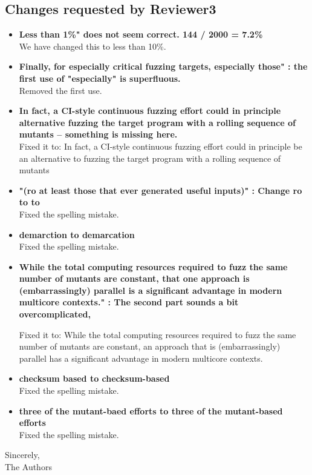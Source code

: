 \documentclass[11pt]{article}
\begin{document}
\subsection*{Changes requested by Reviewer3}
\begin{itemize}
\item \textbf{Less than 1\%" does not seem correct. 144 / 2000 = 7.2\%}\\
We have changed this to less than 10\%.

\item \textbf{Finally, for especially critical fuzzing targets, especially
those" : the first use of "especially" is superfluous.}\\
Removed the first use.

\item \textbf{In fact, a CI-style continuous fuzzing effort could in principle
alternative fuzzing the target program with a rolling sequence of mutants --
something is missing here.}\\
Fixed it to: In fact, a CI-style continuous fuzzing effort could in principle be
an alternative to fuzzing the target program with a rolling sequence of mutants

\item \textbf{"(ro at least those that ever generated useful inputs)" : Change
ro to to} \\
Fixed the spelling mistake.

\item \textbf{demarction to demarcation}\\
Fixed the spelling mistake.

\item \textbf{While the total computing resources required to fuzz the same
number of mutants are constant, that one approach is (embarrassingly) parallel
is a significant advantage in modern multicore contexts." : The second part
sounds a bit overcomplicated,}

Fixed it to: While the total computing resources required to fuzz the same
number of mutants are constant, an approach that is (embarrassingly) parallel
has a significant advantage in modern multicore contexts.                                          

\item \textbf{checksum based to checksum-based}\\
Fixed the spelling mistake.

\item \textbf{three of the mutant-baed efforts to three of the mutant-based
efforts}\\
Fixed the spelling mistake.

\end{itemize}

\noindent{}Sincerely, \\
The Authors
\end{document}
